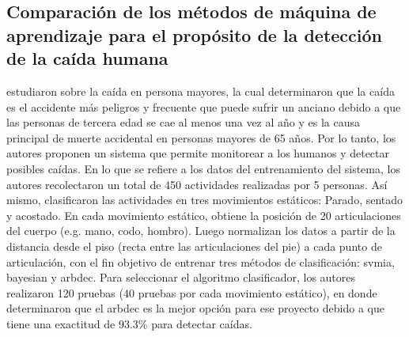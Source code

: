 \subsection{Comparaci\'on de los m\'etodos de m\'aquina de aprendizaje para el prop\'osito de la detecci\'on de la ca\'ida humana} \label{tr:4}
 estudiaron sobre la  ca\'ida en persona mayores, la cual determinaron que la ca\'ida  es el accidente m\'as peligros y frecuente que puede sufrir un anciano debido a que las personas de tercera edad se cae al menos una vez al a\~no y es la causa principal de muerte accidental en personas mayores de 65 a\~nos. Por lo tanto, los autores proponen un sistema que permite monitorear a los humanos y detectar posibles ca\'idas.
\medbreak
En lo que se refiere a los datos del entrenamiento del sistema, los autores recolectaron un total de 450 actividades realizadas por 5 personas. As\'i mismo, clasificaron las actividades en tres movimientos est\'aticos: Parado, sentado y acostado. En cada movimiento est\'atico, obtiene la posici\'on de 20 articulaciones del cuerpo (e.g. mano, codo, hombro). Luego normalizan los datos a partir de la distancia desde el piso (recta entre las articulaciones del pie) a cada punto de articulaci\'on, con el fin objetivo de entrenar tres m\'etodos de clasificaci\'on: \gls{svmia}, \gls{bayesian} y \gls{arbdec}.
\medbreak
Para seleccionar el algoritmo clasificador, los autores realizaron 120 pruebas (40 pruebas por cada movimiento est\'atico), en donde determinaron  que el \gls{arbdec} es la mejor opci\'on para ese proyecto debido a que tiene una exactitud de 93.3\% para detectar ca\'idas.
